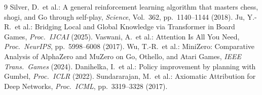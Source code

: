 \documentclass[a4paper,10pt,twocolumn]{ltjsarticle}
\begin{document}
\begin{thebibliography}{9}
\small
{} Silver, D.\ et al.: A general reinforcement learning
  algorithm that masters chess, shogi, and Go through self-play,
  \textit{Science}, Vol.~362, pp.~1140--1144 (2018).
 Ju, Y.-R.\ et al.: Bridging Local and Global Knowledge via
  Transformer in Board Games, \textit{Proc.\ IJCAI} (2025).
 Vaswani, A.\ et al.: Attention Is All You Need,
  \textit{Proc.\ NeurIPS}, pp.~5998--6008 (2017).
 Wu, T.-R.\ et al.: MiniZero: Comparative Analysis of
  AlphaZero and MuZero on Go, Othello, and Atari Games,
  \textit{IEEE Trans.\ Games} (2024).
 Danihelka, I.\ et al.: Policy improvement by planning with
  Gumbel, \textit{Proc.\ ICLR} (2022).
 Sundararajan, M.\ et al.: Axiomatic Attribution for Deep Networks,
  \textit{Proc.\ ICML}, pp.~3319--3328 (2017).
\end{thebibliography}
\end{document}
